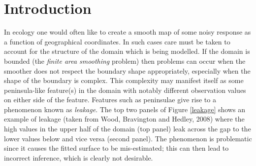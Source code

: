 \documentclass[useAMS, referee]{biom}
\begin{document}

%
\section{Introduction \label{IN}}

In ecology one would often like to create a smooth map of some noisy response as a function of geographical coordinates. In such cases care must be taken to account for the structure of the domain which is being modelled. If the domain is bounded (the \textit{finite area smoothing} problem) then problems can occur when the smoother does not respect the boundary shape appropriately, especially when the shape of the boundary is complex. This complexity may manifest itself as some peninsula-like feature(s) in the domain with notably different observation values on either side of the feature. Features such as peninsulae give rise to a phenomenon known as \emph{leakage}. The top two panels of Figure \ref{leakage} shows an example of leakage (taken from Wood, Bravington and Hedley, 2008) where the high values in the upper half of the domain (top panel) leak across the gap to the lower values below and vice versa (second panel). The phenomenon is problematic since it causes the fitted surface to be mis-estimated; this can then lead to incorrect inference, which is clearly not desirable. 
\end{document}
